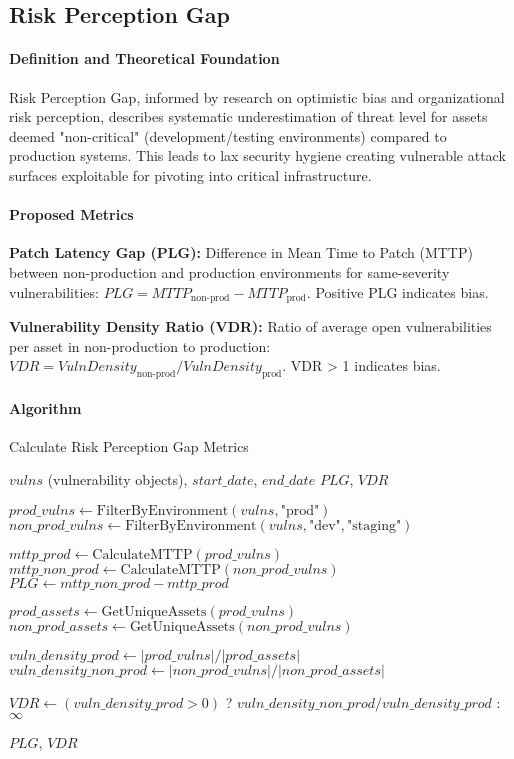 \documentclass[11pt, a4paper]{article}
\begin{document}
\subsection{Risk Perception Gap}
\label{subsec:risk_perception_gap}

\paragraph{Definition and Theoretical Foundation}
Risk Perception Gap, informed by research on optimistic bias\cite{tsohou2015analyzing} and organizational risk perception\cite{maalem2020review}, describes systematic underestimation of threat level for assets deemed "non-critical" (development/testing environments) compared to production systems. This leads to lax security hygiene creating vulnerable attack surfaces exploitable for pivoting into critical infrastructure.

\paragraph{Proposed Metrics}
\textbf{Patch Latency Gap (PLG):} Difference in Mean Time to Patch (MTTP) between non-production and production environments for same-severity vulnerabilities: $PLG = MTTP_{\text{non-prod}} - MTTP_{\text{prod}}$. Positive PLG indicates bias.

\textbf{Vulnerability Density Ratio (VDR):} Ratio of average open vulnerabilities per asset in non-production to production: $VDR = VulnDensity_{\text{non-prod}} / VulnDensity_{\text{prod}}$. VDR > 1 indicates bias.

\paragraph{Algorithm}

\begin{algorithm}[H]
\caption{Calculate Risk Perception Gap Metrics}
\begin{algorithmic}[1]
\Require $vulns$ (vulnerability objects), $start\_date$, $end\_date$
\Ensure $PLG$, $VDR$

\State $prod\_vulns \gets \text{FilterByEnvironment}(vulns, \text{"prod"})$
\State $non\_prod\_vulns \gets \text{FilterByEnvironment}(vulns, \text{"dev"}, \text{"staging"})$

\State $mttp\_prod \gets \text{CalculateMTTP}(prod\_vulns)$
\State $mttp\_non\_prod \gets \text{CalculateMTTP}(non\_prod\_vulns)$
\State $PLG \gets mttp\_non\_prod - mttp\_prod$

\State $prod\_assets \gets \text{GetUniqueAssets}(prod\_vulns)$
\State $non\_prod\_assets \gets \text{GetUniqueAssets}(non\_prod\_vulns)$

\State $vuln\_density\_prod \gets |prod\_vulns| / |prod\_assets|$
\State $vuln\_density\_non\_prod \gets |non\_prod\_vulns| / |non\_prod\_assets|$

\State $VDR \gets (vuln\_density\_prod > 0)$ ? $vuln\_density\_non\_prod / vuln\_density\_prod$ : $\infty$

\State \Return $PLG$, $VDR$
\end{algorithmic}
\end{algorithm}
\end{document}
